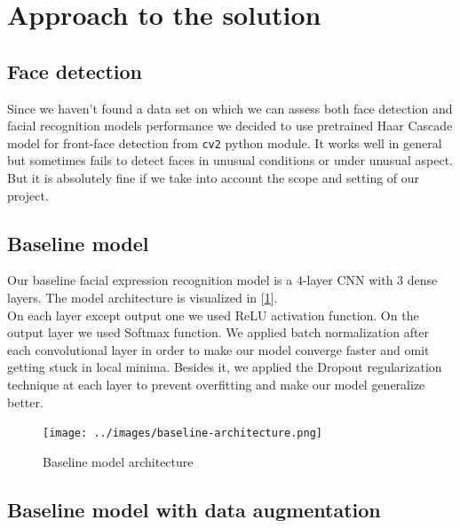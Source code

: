 



\section{Approach to the solution}
\subsection{Face detection}

 Since we haven't found a data set on which we can assess both face detection and facial recognition models performance we decided to use pretrained Haar Cascade model for front-face detection from \texttt{cv2} python module. It works well in general but sometimes fails to detect faces in unusual conditions or under unusual aspect. But it is absolutely fine if we take into account the scope and setting of our project.\\

\subsection{Baseline model}

Our baseline facial expression recognition model is a 4-layer CNN with 3 dense layers. The model architecture is visualized in [\ref{fig:baseline}].\\

On each layer except output one we used ReLU activation function. On the output layer we used Softmax function. We applied batch normalization after each convolutional layer in order to make our model converge faster and omit getting stuck in local minima. Besides it, we applied the Dropout regularization technique at each layer to prevent overfitting and make our model generalize better. \\

\begin{figure}
	\centering
	\texttt{[image: ../images/baseline-architecture.png]}
	\caption{Baseline model architecture}
	\label{fig:baseline}
\end{figure}

\subsection{Baseline model with data augmentation}


